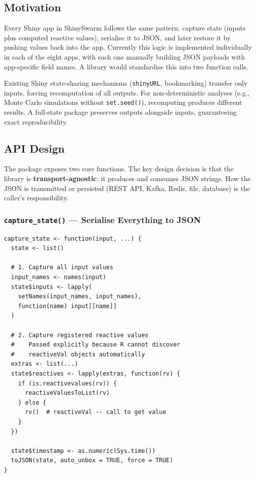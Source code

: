 \documentclass[11pt,a4paper]{article}
\begin{document}
\subsection{Motivation}

Every Shiny app in ShinySwarm follows the same pattern: capture state (inputs
plus computed reactive values), serialise it to JSON, and later restore it by
pushing values back into the app. Currently this logic is implemented
individually in each of the eight apps, with each one manually building JSON
payloads with app-specific field names. A library would standardise this into
two function calls.

Existing Shiny state-sharing mechanisms (\texttt{shinyURL}, bookmarking)
transfer only inputs, forcing recomputation of all outputs. For non-deterministic
analyses (e.g., Monte Carlo simulations without \texttt{set.seed()}), recomputing
produces different results. A full-state package preserves outputs alongside
inputs, guaranteeing exact reproducibility.

\subsection{API Design}

The package exposes two core functions. The key design decision is that the
library is \textbf{transport-agnostic}: it produces and consumes JSON strings.
How the JSON is transmitted or persisted (REST API, Kafka, Redis, file, database)
is the caller's responsibility.

\subsubsection{\texttt{capture\_state()} --- Serialise Everything to JSON}

\begin{verbatim}
capture_state <- function(input, ...) {
  state <- list()

  # 1. Capture all input values
  input_names <- names(input)
  state$inputs <- lapply(
    setNames(input_names, input_names),
    function(name) input[[name]]
  )

  # 2. Capture registered reactive values
  #    Passed explicitly because R cannot discover
  #    reactiveVal objects automatically
  extras <- list(...)
  state$reactives <- lapply(extras, function(rv) {
    if (is.reactivevalues(rv)) {
      reactiveValuesToList(rv)
    } else {
      rv()  # reactiveVal -- call to get value
    }
  })

  state$timestamp <- as.numeric(Sys.time())
  toJSON(state, auto_unbox = TRUE, force = TRUE)
}
\end{verbatim}
\end{document}
